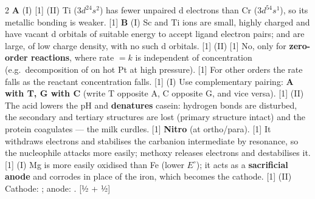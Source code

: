 \documentclass[10pt,a4paper]{extarticle}
\newcommand{\mk}[1]{{\scriptsize\color{black!55}[#1]}}
\begin{document}
\begin{multicols}{2}
\An \textbf{A} (I)  \mk{1}\nl
(II) Ti ($3d^24s^2$) has fewer unpaired d electrons than Cr ($3d^54s^1$), so its metallic bonding is weaker. \mk{1}\nl
\textbf{B} (I) Sc and Ti ions are small, highly charged and have vacant d orbitals of suitable energy to accept ligand electron pairs;  and  are large, of low charge density, with no such d orbitals. \mk{1}\nl
(II)  \mk{1}
\An No, only for \textbf{zero-order reactions}, where rate $=k$ is independent of concentration (e.g.\ decomposition of  on hot Pt at high pressure). \mk{1} For other orders the rate falls as the reactant concentration falls. \mk{1}
\An (I) \chk Use complementary pairing: \textbf{A with T, G with C} (write T opposite A, C opposite G, and vice versa). \mk{1}\nl
(II) The acid lowers the pH and \textbf{denatures} casein: hydrogen bonds are disturbed, the secondary and tertiary structures are lost (primary structure intact) and the protein coagulates — the milk curdles. \mk{1}
\An \textbf{Nitro} (at ortho/para). \mk{1} It withdraws electrons and stabilises the carbanion intermediate by resonance, so the nucleophile attacks more easily; methoxy releases electrons and destabilises it. \mk{1}
\An (I) Mg is more easily oxidised than Fe (lower $E^\circ$); it acts as a \textbf{sacrificial anode} and corrodes in place of the iron, which becomes the cathode. \mk{1}\nl
(II) Cathode: ; anode: . \mk{½ + ½}


\end{multicols}
\end{document}
